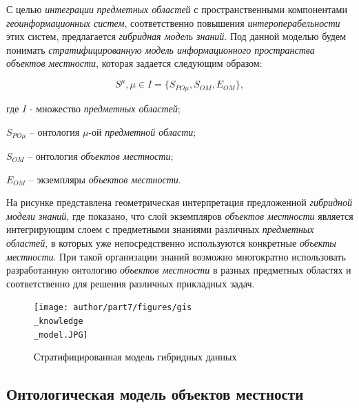 С целью \textit{интеграции} \textit{предметных областей} с пространственными компонентами \textit{геоинформационных систем}, соответственно повышения \textit{интероперабельности} этих систем, предлагается \textit{гибридная модель знаний}. Под данной моделью будем понимать \textit{стратифицированную модель информационного пространства объектов местности}, которая задается следующим образом:

\begin{equation} 
	\label{<eq2_1>} 
	S^{\mu}, \mu  \in I = \{S_{PO\mu}, S_{OM}, E_{OM}\},
\end{equation} 

\parindent=8mm
\noindent \hangindent=22mm 
где $I$ - множество \textit{предметных областей};

\hangindent=22mm 
$S_{PO\mu}$ – онтология ${\mu}$-ой \textit{предметной области};

\hangindent=30mm 
$S_{OM}$ – онтология \textit{объектов местности};

\hangindent=30mm 
$E_{OM}$ – экземпляры \textit{объектов местности}.

На рисунке  представлена геометрическая интерпретация предложенной \textit{гибридной модели знаний}, где показано, что слой экземпляров \textit{объектов местности} является интегрирующим слоем с предметными знаниями различных \textit{предметных областей}, в которых уже непосредственно используются конкретные \textit{объекты местности}. При такой организации знаний возможно многократно использовать  разработанную онтологию \textit{объектов местности} в разных предметных областях и соответственно для решения различных прикладных задач.

\begin{figure}[H]
\center
\texttt{[image: author/part7/figures/gis\\\_knowledge\\\_model.JPG]}
\caption{Стратифицированная модель гибридных данных} 
\label{fig:pic2_1}
\end{figure}

\subsection{Онтологическая модель объектов местности}
\label{chapter_gis_sec_onto_model}

\begin{SCn}
\begin{scnindent}
	\begin{scneqtoset}
	\end{scneqtoset}
\end{scnindent}
\end{SCn}

